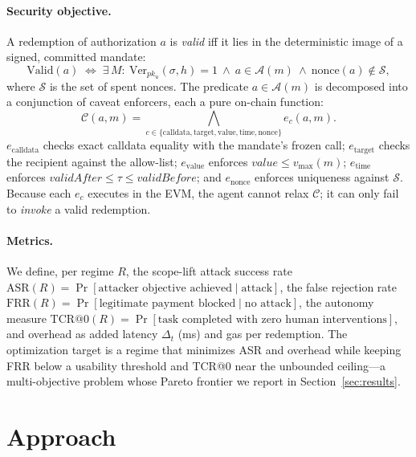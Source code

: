 \documentclass[10pt,twocolumn,letterpaper]{article}
\begin{document}
\paragraph{Security objective.} A redemption of authorization $a$ is \emph{valid} iff it lies in the deterministic image of a signed, committed mandate:
\begin{equation}
\mathrm{Valid}(a) \;\Longleftrightarrow\; \exists\, M:\ \mathrm{Ver}_{pk_u}(\sigma,h)=1 \ \wedge\ a \in \mathcal{A}(m) \ \wedge\ \mathrm{nonce}(a)\notin \mathcal{S},
\label{eq:valid}
\end{equation}
where $\mathcal{S}$ is the set of spent nonces. The predicate $a\in\mathcal{A}(m)$ is decomposed into a conjunction of caveat enforcers, each a pure on-chain function:
\begin{equation}
\mathcal{C}(a,m)=\bigwedge_{c\in\{\text{calldata},\text{target},\text{value},\text{time},\text{nonce}\}} \!\!\! e_c(a,m).
\label{eq:caveat}
\end{equation}
$e_{\text{calldata}}$ checks exact calldata equality with the mandate's frozen call; $e_{\text{target}}$ checks the recipient against the allow-list; $e_{\text{value}}$ enforces $\textit{value}\le v_{\max}(m)$; $e_{\text{time}}$ enforces $\textit{validAfter}\le \tau \le \textit{validBefore}$; and $e_{\text{nonce}}$ enforces uniqueness against $\mathcal{S}$. Because each $e_c$ executes in the EVM, the agent cannot relax $\mathcal{C}$; it can only fail to \emph{invoke} a valid redemption.

\paragraph{Metrics.} We define, per regime $R$, the scope-lift attack success rate $\mathrm{ASR}(R)=\Pr[\text{attacker objective achieved}\mid \text{attack}]$, the false rejection rate $\mathrm{FRR}(R)=\Pr[\text{legitimate payment blocked}\mid \text{no attack}]$, the autonomy measure $\mathrm{TCR@0}(R)=\Pr[\text{task completed with zero human interventions}]$, and overhead as added latency $\Delta_t$ (ms) and gas per redemption. The optimization target is a regime that minimizes ASR and overhead while keeping FRR below a usability threshold and TCR@0 near the unbounded ceiling---a multi-objective problem whose Pareto frontier we report in Section~\ref{sec:results}.

\section{Approach}
\end{document}
